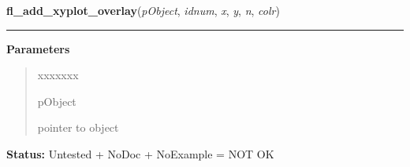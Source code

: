 \hspace{.8\funcindent}\begin{boxedminipage}{\funcwidth}

    \raggedright \textbf{fl\_add\_xyplot\_overlay}(\textit{pObject}, \textit{idnum}, \textit{x}, \textit{y}, \textit{n}, \textit{colr})

    \vspace{-1.5ex}

    \rule{\textwidth}{0.5\fboxrule}
\setlength{\parskip}{2ex}
\setlength{\parskip}{1ex}
      \textbf{Parameters}
      \vspace{-1ex}

      \begin{quote}
        \begin{Ventry}{xxxxxxx}

          \item[pObject]

          pointer to object

        \end{Ventry}

      \end{quote}

\textbf{Status:} Untested + NoDoc + NoExample = NOT OK



    \end{boxedminipage}

    \label{xformslib:library:fl_add_xyplot_overlay_file}

    \vspace{0.5ex}

